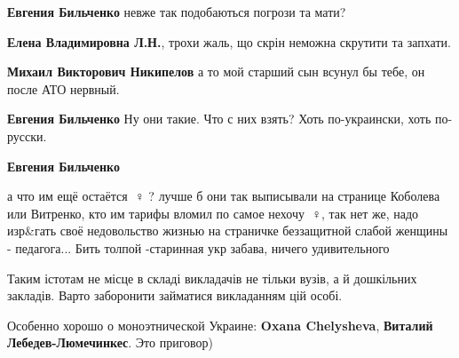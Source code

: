 \begin{itemize}
\begin{itemize}
\textbf{Евгения Бильченко} невже так подобаються погрози та мати?


\textbf{Елена Владимировна Л.Н.}, трохи жаль, що скрін неможна скрутити та запхати.


\textbf{Михаил Викторович Никипелов} а то мой старший сын всунул бы тебе, он после АТО нервный.


\textbf{Евгения Бильченко} Ну они такие. Что с них взять? Хоть по-украински, хоть по-русски.


\textbf{Евгения Бильченко} 

а что им ещё остаётся 🤦♀️ ? лучше б они так
выписывали на странице Коболева или Витренко, кто им тарифы вломил по самое
нехочу 🤦♀️, так нет же, надо изр\&гать своё недовольство жизнью на страничке
беззащитной слабой женщины - педагога... Бить толпой -старинная укр забава,
ничего удивительного

\end{itemize}



Таким істотам не місце в складі викладачів не тільки вузів, а й дошкільних закладів.
Варто заборонити займатися викладанням цій особі.




Особенно хорошо о моноэтнической Украине: \textbf{Oxana Chelysheva},
\textbf{Виталий Лебедев-Люмечинкес}. Это приговор)

\begin{itemize}


\end{itemize}
\end{itemize}
